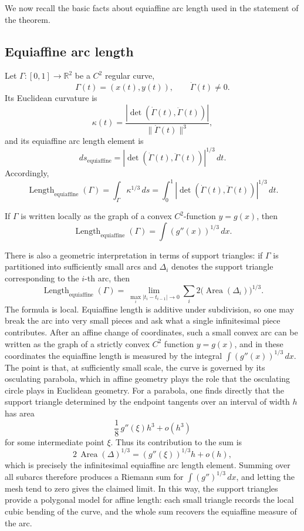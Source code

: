 \documentclass[a4paper,american,11pt]{amsart}
\theoremstyle{plain}
\theoremstyle{definition}
\newcommand{\R}{\mathbb R}
\DeclareMathOperator{\Area}{Area}
\DeclareMathOperator{\Length}{Length}
\begin{document}
We now recall the basic facts about equiaffine arc length used in the statement
of the theorem.

\subsection{Equiaffine arc length}

Let \(\Gamma:[0,1]\to\R^2\) be a \(C^2\) regular curve,
\[
\Gamma(t)=(x(t),y(t)),
\qquad
\dot\Gamma(t)\neq 0.
\]
Its Euclidean curvature is
\[
\kappa(t)=
\frac{|\det(\dot\Gamma(t),\ddot\Gamma(t))|}
{\|\dot\Gamma(t)\|^3},
\]
and its equiaffine arc length element is
\[
ds_{\mathrm{equiaffine}}
=
|\det(\dot\Gamma(t),\ddot\Gamma(t))|^{1/3}\,dt.
\]
Accordingly,
\[
\Length_{\mathrm{equiaffine}}(\Gamma)
=
\int_\Gamma \kappa^{1/3}\,ds
=
\int_0^1 |\det(\dot\Gamma(t),\ddot\Gamma(t))|^{1/3}\,dt.
\]

If \(\Gamma\) is written locally as the graph of a convex \(C^2\)-function
\(y=g(x)\), then
\[
\Length_{\mathrm{equiaffine}}(\Gamma)
=
\int (g''(x))^{1/3}\,dx.
\]

There is also a geometric interpretation in terms of support triangles: if
\(\Gamma\) is partitioned into sufficiently small arcs and \(\Delta_i\)
denotes the support triangle corresponding to the \(i\)-th arc, then
\cite{Blaschke1923,Ludwig1999}
\begin{equation}\label{23affine}
\Length_{\mathrm{equiaffine}}(\Gamma)
=
\lim_{\max_i |t_i-t_{i-1}|\to 0}
\sum_i 2 \bigl(\Area(\Delta_i)\bigr)^{1/3}.
\end{equation}
The formula is local. Equiaffine length is additive under subdivision, so one
may break the arc into very small pieces and ask what a single infinitesimal
piece contributes. After an affine change of coordinates, such a small convex
arc can be written as the graph of a strictly convex \(C^2\) function
\(y=g(x)\), and in these coordinates the equiaffine length is measured by the
integral \(\int (g''(x))^{1/3}\,dx\). The point is that, at sufficiently small
scale, the curve is governed by its osculating parabola, which in affine
geometry plays the role that the osculating circle plays in Euclidean
geometry. For a parabola, one finds directly that the support triangle
determined by the endpoint tangents over an interval of width \(h\) has area
\[
\frac18\,g''(\xi)h^3+o(h^3)
\]
for some intermediate point \(\xi\). Thus its contribution to the sum is
\[
2\,\Area(\Delta)^{1/3}=(g''(\xi))^{1/3}h+o(h),
\]
which is precisely the infinitesimal equiaffine arc length element. Summing
over all subarcs therefore produces a Riemann sum for
\(\int (g'')^{1/3}\,dx\), and letting the mesh tend to zero gives the claimed
limit. In this way, the support triangles provide a polygonal model for affine
length: each small triangle records the local cubic bending of the curve, and
the whole sum recovers the equiaffine measure of the arc.
\end{document}
